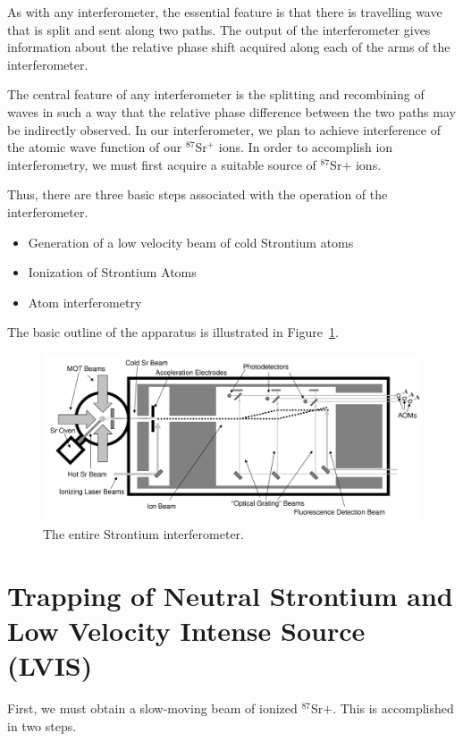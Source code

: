 As with any interferometer, the essential feature is that there is travelling wave that is split and sent along two paths. The output of the interferometer gives information about the relative phase shift acquired along each of the arms of the interferometer. 

The central feature of any interferometer is the splitting and recombining of waves in such a way that the relative phase difference between the two paths may be indirectly observed. In our interferometer, we plan to achieve interference of the atomic wave function of our $^{87}$Sr$^+$ ions. 
In order to accomplish ion interferometry, we must first acquire a suitable source of $^{87}$Sr$+$ ions. 

Thus, there are three basic steps associated with the operation of the interferometer. 
\begin{itemize}
\item Generation of a low velocity beam of cold Strontium atoms   
\item Ionization of Strontium Atoms
\item Atom interferometry
\end{itemize} 

The basic outline of the apparatus is illustrated in Figure~\ref{fig:IonInterferometer}.

\begin{figure}
\centerline{
\includegraphics[totalheight=0.3\textheight]{interferometer_diagram}
}
\caption[Ion Interferometer]{\label{fig:IonInterferometer}
The entire Strontium interferometer. } 
\end{figure}

\section{Trapping of Neutral Strontium and Low Velocity Intense Source (LVIS)}

First, we must obtain a slow-moving beam of ionized $^{87}$Sr$+$. This is accomplished in two steps. 

